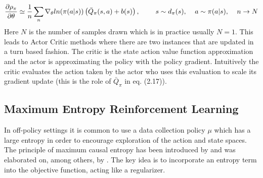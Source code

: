 \begin{align}
\frac{\partial\rho_\pi}{\partial\theta} \simeq \frac{1}{n}\sum_{n} \nabla_\theta ln (\pi(a|s))\left( \bar{Q}_\pi(s,a)+b(s)\right),\text{\hspace{8mm}} s\sim d_\pi(s), \text{\hspace{4mm}} a\sim \pi(a|s), \text{\hspace{4mm}} n\rightarrow N
\end{align}
Here $N$ is the number of samples drawn which is in practice usually $N=1$.
This leads to Actor Critic methods where there are two instances that are updated in a turn based fashion. The critic is the state action value function approximation and the actor is approximating the policy with the policy gradient. Intuitively the critic evaluates the action taken by the actor who uses this evaluation to scale its gradient update (this is the role of $\bar{Q}_\pi$ in eq. (2.17)).

\subsection{Maximum Entropy Reinforcement Learning}
In off-policy settings it is common to use a data collection policy $\mu$ which has a large entropy in order to encourage exploration of the action and state spaces. The principle of maximum causal entropy has been introduced by \cite{AAAIziebert} and was elaborated on, among others, by \cite{DBLP:journals/corr/HaarnojaTAL17}. The key idea is to incorporate an entropy term into the objective function, acting like a regularizer. 

